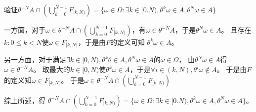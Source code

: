 \documentclass{ctexart}
\newif\ifpreface
\begin{document}
\large
\setlength{\baselineskip}{1.2em}
\ifpreface

\newgeometry{left=2cm,right=2cm,top=2cm,bottom=2cm}
\else
{}
\maketitle
\fi
\begin{problem}\label{pro:1}
  验证\(\theta^{-N} A \cap (\bigcup_{k=0}^{N-1}F_{[k,N)}) = \{\omega \in \Omega: \exists k \in [0.N),\theta^k \omega \in A, \theta^N \omega \in A\} \)
\end{problem}
\begin{solution}
  一方面，对于\(\omega \in  \theta^{-N} A \cap (\bigcup_{k=0}^{N-1}F_{[k,N)}) \)，有\(\omega \in \theta^{-N}A \)，于是\(\theta^N \omega \in A \)。
  且存在\(k:0 \leq k <N \)使\(\omega \in F_{[k,N)} \)，于是由\(F \)的定义可知 \(\theta^k \omega \in A \)。

  另一方面，对于满足\(\exists k \in [0,N),\theta^k \theta \in A,\theta^N \omega \in A \)的\(\omega \in \Omega \)，
  由\(\theta^N \omega \in A \)得\(\omega \in \theta^{-N} A \)。
  取最大的\(k \in [0,N) \)使\(\theta^k \omega \in A \)，于是\(\forall i \in (k,N),\theta^i \omega \notin A \)。
  于是由\(F \)的定义知\(\omega \in F_{[k,N)} \)。
  于是\(\omega \in  \theta^{-N} A \cap (\bigcup_{k=0}^{N-1}F_{[k,N)})\)

  综上所述，得 \(\theta^{-N} A \cap (\bigcup_{k=0}^{N-1}F_{[k,N)}) = \{\omega \in \Omega: \exists k \in [0.N),\theta^k \omega \in A, \theta^N \omega \in A\} \)。
\end{solution}
\end{document}
